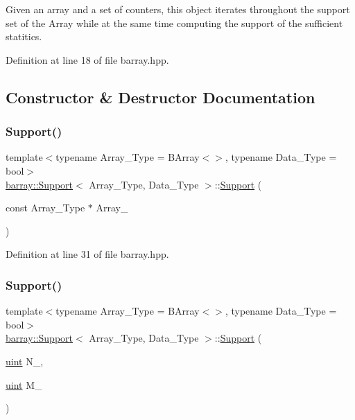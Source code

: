 Given an array and a set of counters, this object iterates throughout the support set of the Array while at the same time computing the support of the sufficient statitics. 

Definition at line 18 of file barray.\+hpp.



\subsection{Constructor \& Destructor Documentation}
\mbox{\label{classbarray_1_1_support_a594b9cf01893e23b57e86983ce2237d9}} 
\subsubsection{\texorpdfstring{Support()}{Support()}\hspace{0.1cm}{\footnotesize\ttfamily [1/2]}}
{\footnotesize\ttfamily template$<$typename Array\+\_\+\+Type  = B\+Array$<$$>$, typename Data\+\_\+\+Type  = bool$>$ \\
\hyperlink{classbarray_1_1_support}{barray\+::\+Support}$<$ Array\+\_\+\+Type, Data\+\_\+\+Type $>$\+::\hyperlink{classbarray_1_1_support}{Support} (\begin{DoxyParamCaption}\item[{const Array\+\_\+\+Type $\ast$}]{Array\+\_\+ }\end{DoxyParamCaption})\hspace{0.3cm}{\ttfamily [inline]}}



Definition at line 31 of file barray.\+hpp.

\mbox{\label{classbarray_1_1_support_a0ebc245e9510db0392761c0f0eed808c}} 
\subsubsection{\texorpdfstring{Support()}{Support()}\hspace{0.1cm}{\footnotesize\ttfamily [2/2]}}
{\footnotesize\ttfamily template$<$typename Array\+\_\+\+Type  = B\+Array$<$$>$, typename Data\+\_\+\+Type  = bool$>$ \\
\hyperlink{classbarray_1_1_support}{barray\+::\+Support}$<$ Array\+\_\+\+Type, Data\+\_\+\+Type $>$\+::\hyperlink{classbarray_1_1_support}{Support} (\begin{DoxyParamCaption}\item[{\hyperlink{namespacebarray_af9756a31953db233f80a9cfe1ef31c32}{uint}}]{N\+\_\+,  }\item[{\hyperlink{namespacebarray_af9756a31953db233f80a9cfe1ef31c32}{uint}}]{M\+\_\+ }\end{DoxyParamCaption})\hspace{0.3cm}{\ttfamily [inline]}}




